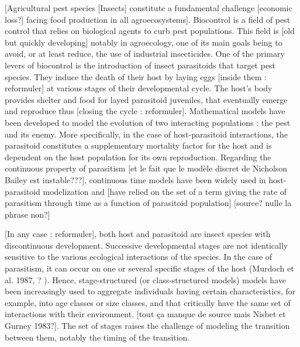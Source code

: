 \documentclass[12pt,a4paper,onecolumn]{article}
\begin{document}
\tabto{1 cm}[Agricultural pest species [Insects] constitute a fundamental challenge [economic loss?] facing food production in all agroecosystems]. Biocontrol is a field of pest control that relies on biological agents to curb pest populations. This field is [old but quickly developing] notably in agroecology, one of its main goals being to avoid, or at least reduce, the use of industrial insecticides. One of the primary levers of biocontrol is the introduction of insect parasitoids that target pest species. They induce the death of their host by laying eggs [inside them : reformuler] at various stages of their developmental cycle. The host's body provides shelter and food for layed parasitoid juveniles, that eventually emerge and reproduce thus [closing the cycle : reformuler]. Mathematical models have been developed to model the evolution of two interacting populations : the pest and its enemy. More specifically, in the case of host-parasitoid interactions, the parasitoid constitutes a supplementary mortality factor for the host and is dependent on the host population for its own reproduction. Regarding the continuous property of parasitism [et le fait que le modèle discret de Nicholson Bailey est instable???], continuous time models have been widely used in host-parasitoid modelization and [have relied on the set of a term giving the rate of parasitism through time as a function of parasitoid population] [source? nulle la phrase non?]

\tabto{1 cm} [In any case : reformuler], both host and parasitoid are insect species with discontinuous development. Successive developmental stages are not identically sensitive to the various ecological interactions of the species. In the case of parasitism, it can occur on one or several specific stages of the host (Murdoch et al. 1987, ? ). Hence, stage-structured (or class-structured models) models have been increasingly used to aggregate individuals having certain characteristics, for example, into age classes or size classes, and that critically have the same set of interactions with their environment.  [tout ça manque de source mais Nisbet et Gurney 1983?]. The set of stages raises the challenge of modeling the transition between them, notably the timing of the transition.
\end{document}
